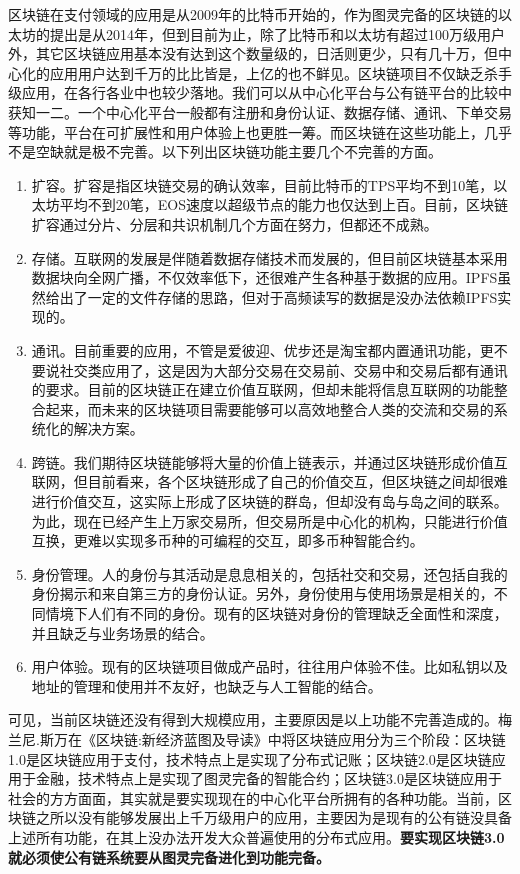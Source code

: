 \documentclass[a4paper,12pt]{article}
\begin{document}
区块链在支付领域的应用是从2009年的比特币开始的，作为图灵完备的区块链的以太坊的提出是从2014年，但到目前为止，除了比特币和以太坊有超过100万级用户外，其它区块链应用基本没有达到这个数量级的，日活则更少，只有几十万，但中心化的应用用户达到千万的比比皆是，上亿的也不鲜见。区块链项目不仅缺乏杀手级应用，在各行各业中也较少落地。我们可以从中心化平台与公有链平台的比较中获知一二。一个中心化平台一般都有注册和身份认证、数据存储、通讯、下单交易等功能，平台在可扩展性和用户体验上也更胜一筹。而区块链在这些功能上，几乎不是空缺就是极不完善。以下列出区块链功能主要几个不完善的方面。

\begin{enumerate}
\item 扩容。扩容是指区块链交易的确认效率，目前比特币的TPS平均不到10笔，以太坊平均不到20笔，EOS速度以超级节点的能力也仅达到上百。目前，区块链扩容通过分片、分层和共识机制几个方面在努力，但都还不成熟。
\item 存储。互联网的发展是伴随着数据存储技术而发展的，但目前区块链基本采用数据块向全网广播，不仅效率低下，还很难产生各种基于数据的应用。IPFS虽然给出了一定的文件存储的思路，但对于高频读写的数据是没办法依赖IPFS实现的。
\item 通讯。目前重要的应用，不管是爱彼迎、优步还是淘宝都内置通讯功能，更不要说社交类应用了，这是因为大部分交易在交易前、交易中和交易后都有通讯的要求。目前的区块链正在建立价值互联网，但却未能将信息互联网的功能整合起来，而未来的区块链项目需要能够可以高效地整合人类的交流和交易的系统化的解决方案。
\item 跨链。我们期待区块链能够将大量的价值上链表示，并通过区块链形成价值互联网，但目前看来，各个区块链形成了自己的价值交互，但区块链之间却很难进行价值交互，这实际上形成了区块链的群岛，但却没有岛与岛之间的联系。为此，现在已经产生上万家交易所，但交易所是中心化的机构，只能进行价值互换，更难以实现多币种的可编程的交互，即多币种智能合约。
\item 身份管理。人的身份与其活动是息息相关的，包括社交和交易，还包括自我的身份揭示和来自第三方的身份认证。另外，身份使用与使用场景是相关的，不同情境下人们有不同的身份。现有的区块链对身份的管理缺乏全面性和深度，并且缺乏与业务场景的结合。
\item 用户体验。现有的区块链项目做成产品时，往往用户体验不佳。比如私钥以及地址的管理和使用并不友好，也缺乏与人工智能的结合。
\end{enumerate}

可见，当前区块链还没有得到大规模应用，主要原因是以上功能不完善造成的。梅兰尼.斯万在《区块链:新经济蓝图及导读》\citep{swan2015}中将区块链应用分为三个阶段：区块链1.0是区块链应用于支付，技术特点上是实现了分布式记账；区块链2.0是区块链应用于金融，技术特点上是实现了图灵完备的智能合约；区块链3.0是区块链应用于社会的方方面面，其实就是要实现现在的中心化平台所拥有的各种功能。当前，区块链之所以没有能够发展出上千万级用户的应用，主要因为是现有的公有链没具备上述所有功能，在其上没办法开发大众普遍使用的分布式应用。\textbf{要实现区块链3.0就必须使公有链系统要从图灵完备进化到功能完备。}
\end{document}
